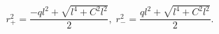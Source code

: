 \begin{equation}
r^2_{+}= \frac{-ql^2+\sqrt{l^4+C^2l^2}}{2}, \; r^2_{-}= \frac{ql^2+\sqrt{l^4+C^2l^2}}{2}.
\end{equation}

